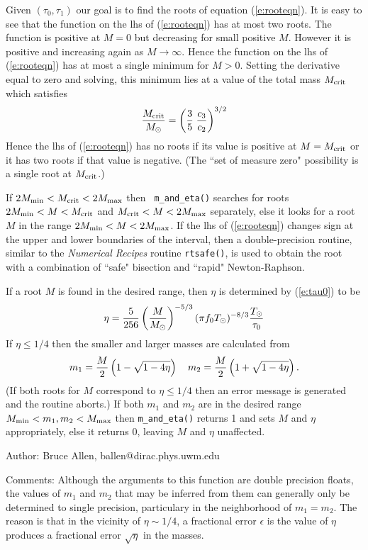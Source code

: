 Given $(\tau_0,\tau_1)$ our goal is to find the roots of equation
(\ref{e:rooteqn}).  It is easy to see that the function on the lhs of
(\ref{e:rooteqn}) has at most two roots.  The function is positive at
$M=0$ but decreasing for small positive $M$.  However it is positive and
increasing again as $M \rightarrow \infty$.  Hence the function on the
lhs of (\ref{e:rooteqn}) has at most a single minimum for $M>0$.
Setting the derivative equal to zero and solving, this minimum lies at
a value of the total mass $M_{\rm crit}$ which satisfies
\begin{equation}
{M_{\rm crit} \over M_\odot} =
   \left( {3 \over 5} \; {c_3 \over c_2} \right)^{3/2}
\end{equation}
Hence the lhs of (\ref{e:rooteqn}) has no roots if its value is
positive at $M=M_{\rm crit}$ or it has two roots if that value is
negative.  (The ``set of measure zero" possibility is a single root at
$M_{\rm crit}$.)

If $2 M_{\rm min} < M_{\rm crit} < 2 M_{\rm max}$ then {\tt
m\_and\_eta()} searches for roots $2 M_{\rm min} < M < M_{\rm crit} $
and $  M_{\rm crit} < M< 2 M_{\rm max}$ separately, else it looks for a
root $M$ in the range $2 M_{\rm min} < M  < 2 M_{\rm max}$.  If
the lhs of (\ref{e:rooteqn}) changes sign at the upper and lower
boundaries of the interval, then a double-precision routine, similar to
the {\it Numerical Recipes} routine {\tt rtsafe()}, is used to obtain
the root with a combination of ``safe" bisection and ``rapid"
Newton-Raphson.

If a root $M$ is found in the desired range, then $\eta$ is
determined by (\ref{e:tau0}) to be
\begin{equation}
\eta={5 \over 256} \left( {M \over M_\odot} \right)^{-5/3}
(\pi f_0 T_\odot)^{-8/3} {T_\odot \over \tau_0}
\end{equation}
If $\eta \le
1/4$ then the smaller and larger masses are calculated from
\begin{equation}
m_1 = {M \over 2} \left(1-\sqrt{1-4\eta}\right) \quad
m_2 = {M \over 2} \left(1+\sqrt{1-4\eta}\right).
\end{equation}
(If both roots for $M$ correspond to $\eta \le 1/4$ then an error
message is generated and the routine aborts.) If both $m_1$ and $m_2$
are in the desired range $M_{\rm min} < m_1,m_2 <  M_{\rm max}$ then
{\tt m\_and\_eta()} returns 1 and sets $M$ and $\eta$ appropriately,
else it returns 0, leaving $M$ and $\eta$ unaffected.
\begin{description}
\item{Author:}
Bruce Allen, ballen@dirac.phys.uwm.edu
\item{Comments:}
Although the arguments to this function are double precision floats,
the values of $m_1$ and $m_2$ that may be inferred from them can
generally only be determined to single precision, particulary in the
neighborhood of $m_1=m_2$.  The reason is that in the vicinity of $\eta
\sim 1/4$, a fractional error $\epsilon$ is the value of $\eta$
produces a fractional error $\sqrt{\eta}$ in the masses.
\end{description}
\clearpage

